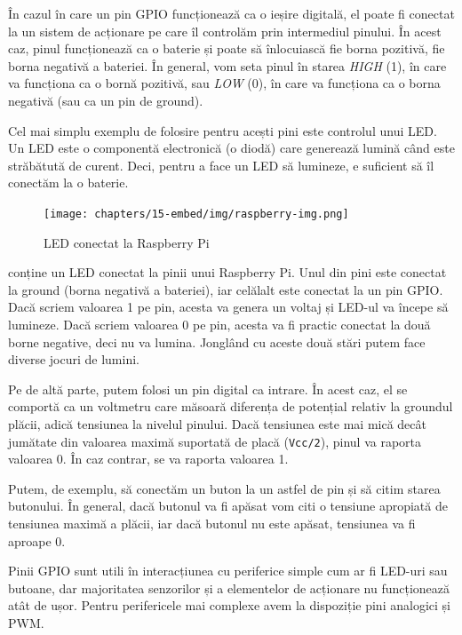 În cazul în care un pin GPIO funcționează ca o ieșire digitală, el poate fi conectat la un sistem de acționare pe care îl controlăm prin intermediul pinului.
În acest caz, pinul funcționează ca o baterie și poate să înlocuiască fie borna pozitivă, fie borna negativă a bateriei.
În general, vom seta pinul în starea \textit{HIGH} (1), în care va funcționa ca o bornă pozitivă, sau \textit{LOW} (0), în care va funcționa ca o borna negativă (sau ca un pin de ground).

Cel mai simplu exemplu de folosire pentru acești pini este controlul unui LED.
 Un LED este o componentă electronică (o diodă) care generează lumină când este străbătută de curent.
Deci, pentru a face un LED să lumineze, e suficient să îl conectăm la o baterie.

\begin{figure}[!htbp]
  \centering
  \texttt{[image: chapters/15-embed/img/raspberry-img.png]}
  \caption{LED conectat la Raspberry Pi}
  \label{fig:embed:raspberry}
\end{figure}

 conține un LED conectat la pinii unui Raspberry Pi.
Unul din pini este conectat la ground (borna negativă a bateriei), iar celălalt este conectat la un pin GPIO.
Dacă scriem valoarea 1 pe pin, acesta va genera un voltaj și LED-ul va începe să lumineze.
Dacă scriem valoarea 0 pe pin, acesta va fi practic conectat la două borne negative, deci nu va lumina.
Jonglând cu aceste două stări putem face diverse jocuri de lumini.

Pe de altă parte, putem folosi un pin digital ca intrare.
În acest caz, el se comportă ca un voltmetru care măsoară diferența de potențial relativ la groundul plăcii, adică tensiunea la nivelul pinului.
Dacă tensiunea este mai mică decât jumătate din valoarea maximă suportată de placă (\texttt{Vcc/2}), pinul va raporta valoarea 0.
În caz contrar, se va raporta valoarea 1.

Putem, de exemplu, să conectăm un buton la un astfel de pin și să citim starea butonului.
În general, dacă butonul va fi apăsat vom citi o tensiune apropiată de tensiunea maximă a plăcii, iar dacă butonul nu este apăsat, tensiunea va fi aproape 0.

Pinii GPIO sunt utili în interacțiunea cu periferice simple cum ar fi LED-uri sau butoane, dar majoritatea senzorilor și a elementelor de acționare nu funcționează atât de ușor.
Pentru perifericele mai complexe avem la dispoziție pini analogici și PWM.

